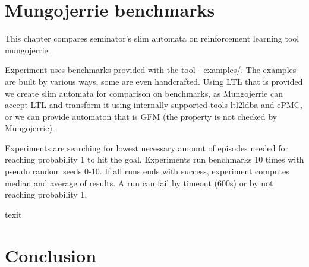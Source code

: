 \documentclass[
	digital
nolof, nolot
]{fithesis3}
\begin{document}
	\chapter{Mungojerrie benchmarks}
	This chapter compares seminator's slim automata on reinforcement learning tool mungojerrie \cite{mungojerrie}.
	
	Experiment uses benchmarks provided with the tool - examples/. The examples are built by various ways, some are even handcrafted. Using LTL that is provided we create slim automata for comparison on benchmarks, as Mungojerrie can accept LTL and transform it using internally supported tools ltl2ldba and ePMC, or we can provide automaton that is GFM (the property is not checked by Mungojerrie).
	
	Experiments are searching for lowest necessary amount of episodes needed for reaching probability 1 to hit the goal. Experiments run benchmarks 10 times with pseudo random seeds 0-10. If all runs ends with success, experiment computes median and average of results. A run can fail by timeout (600s) or by not reaching probability 1.
	
	\begin{table}
		\centering
		\caption{texit}
		
	\end{table}
	
	

	
	
	\chapter{Conclusion}
\end{document}

